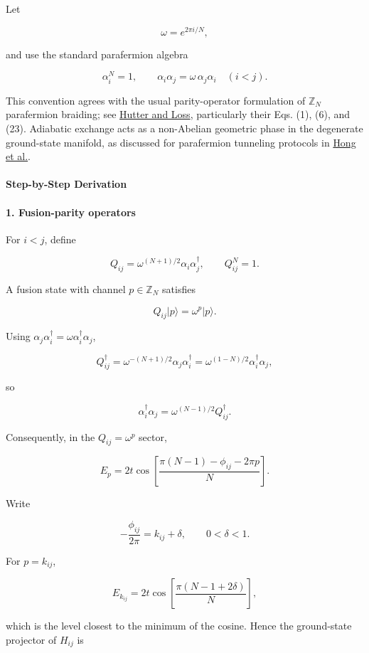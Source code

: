 \documentclass[11pt]{article}
\begin{document}
Let

\[
\omega=e^{2\pi i/N},
\]

and use the standard parafermion algebra

\[
\alpha_i^N=1,
\qquad
\alpha_i\alpha_j=\omega\,\alpha_j\alpha_i
\quad (i<j).
\]

This convention agrees with the usual parity-operator formulation of $\mathbb Z_N$ parafermion braiding; see \href{\detokenize{https://arxiv.org/html/1511.02704v1}}{Hutter and Loss}, particularly their Eqs. (1), (6), and (23). Adiabatic exchange acts as a non-Abelian geometric phase in the degenerate ground-state manifold, as discussed for parafermion tunneling protocols in \href{\detokenize{https://arxiv.org/abs/2403.09602}}{Hong et al.}.

\paragraph*{Step-by-Step Derivation}

\paragraph*{1. Fusion-parity operators}

For $i<j$, define

\[
Q_{ij}
=
\omega^{(N+1)/2}\alpha_i\alpha_j^\dagger,
\qquad
Q_{ij}^N=1.
\]

A fusion state with channel $p\in\mathbb Z_N$ satisfies

\[
Q_{ij}|p\rangle=\omega^p|p\rangle.
\]

Using $\alpha_j\alpha_i^\dagger=\omega\alpha_i^\dagger\alpha_j$,

\[
Q_{ij}^\dagger
=
\omega^{-(N+1)/2}\alpha_j\alpha_i^\dagger
=
\omega^{(1-N)/2}\alpha_i^\dagger\alpha_j,
\]

so

\[
\alpha_i^\dagger\alpha_j
=
\omega^{(N-1)/2}Q_{ij}^\dagger.
\]

Consequently, in the $Q_{ij}=\omega^p$ sector,

\[
E_p
=
2t\cos\!\left[
\frac{\pi(N-1)-\phi_{ij}-2\pi p}{N}
\right].
\]

Write

\[
-\frac{\phi_{ij}}{2\pi}=k_{ij}+\delta,
\qquad 0<\delta<1.
\]

For $p=k_{ij}$,

\[
E_{k_{ij}}
=
2t\cos\!\left[
\frac{\pi(N-1+2\delta)}{N}
\right],
\]

which is the level closest to the minimum of the cosine. Hence the ground-state projector of $H_{ij}$ is
\end{document}
